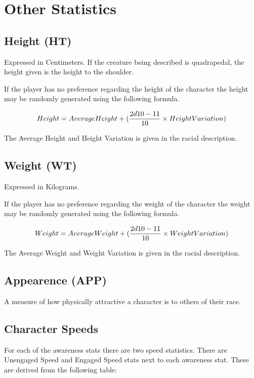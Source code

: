 

\section{Other Statistics}

\subsection{Height (HT)} Expressed in Centimeters. If the creature
being described is quadrapedal, the height given is the height
to the shoulder.

If the player has no preference regarding the height of the character
the height may be randomly generated using the following formula.

\[ Height = {Average Height} + ( {{2d10 - 11} \over {10}} \times
{Height Variation} )
\]

The Average Height and Height Variation is given in the racial
description.

\subsection{Weight (WT)}
Expressed in Kilograms.

If the player has no preference regarding the weight of the character
the weight may be randomly generated using the following formula.

\[ Weight = {Average Weight} + ( {{2d10 - 11} \over {10}} \times
{Weight Variation})
\]

The Average Weight and Weight Variation is given in the racial
description.

\subsection{Appearence        (APP)}
A measure of how physically attractive a character is
to others of their race.

\subsection{Character Speeds}

For each of the awareness stats there are two speed statistics.
There are Unengaged Speed and Engaged Speed stats next to each
awareness stat. These are derived from the following table:



